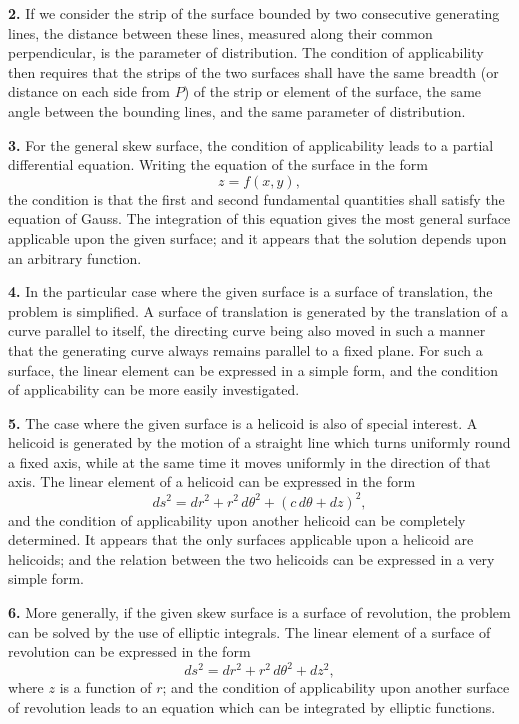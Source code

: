 \documentclass[12pt,a4paper]{article}
\begin{document}
\textbf{2.} If we consider the strip of the surface bounded by two consecutive
generating lines, the distance between these lines, measured along their common
perpendicular, is the parameter of distribution. The condition of applicability
then requires that the strips of the two surfaces shall have the same breadth (or
distance on each side from $P$) of the strip or element of the surface, the same
angle between the bounding lines, and the same parameter of distribution.

\textbf{3.} For the general skew surface, the condition of applicability leads to a
partial differential equation. Writing the equation of the surface in the form
\[
z = f(x, y),
\]
the condition is that the first and second fundamental quantities shall satisfy the
equation of Gauss. The integration of this equation gives the most general
surface applicable upon the given surface; and it appears that the solution depends
upon an arbitrary function.

\textbf{4.} In the particular case where the given surface is a surface of translation,
the problem is simplified. A surface of translation is generated by the translation
of a curve parallel to itself, the directing curve being also moved in such a manner
that the generating curve always remains parallel to a fixed plane. For such a
surface, the linear element can be expressed in a simple form, and the condition of
applicability can be more easily investigated.

\textbf{5.} The case where the given surface is a helicoid is also of special interest.
A helicoid is generated by the motion of a straight line which turns uniformly
round a fixed axis, while at the same time it moves uniformly in the direction of
that axis. The linear element of a helicoid can be expressed in the form
\[
ds^2 = dr^2 + r^2\,d\theta^2 + (c\,d\theta + dz)^2,
\]
and the condition of applicability upon another helicoid can be completely
determined. It appears that the only surfaces applicable upon a helicoid are
helicoids; and the relation between the two helicoids can be expressed in a very
simple form.

\textbf{6.} More generally, if the given skew surface is a surface of revolution,
the problem can be solved by the use of elliptic integrals. The linear element of
a surface of revolution can be expressed in the form
\[
ds^2 = dr^2 + r^2\,d\theta^2 + dz^2,
\]
where $z$ is a function of $r$; and the condition of applicability upon another surface
of revolution leads to an equation which can be integrated by elliptic functions.
\end{document}
